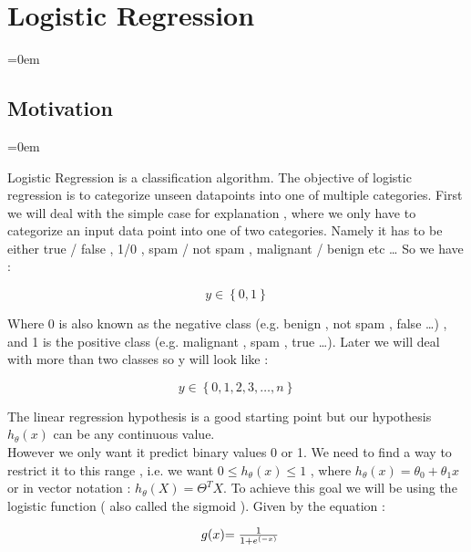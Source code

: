 
\section{Logistic Regression}
\label{sec:logistic_regression}
\parindent=0em

\subsection{Motivation}
\label{ssec:motivation}
\parindent=0em

Logistic Regression is a classification algorithm. The objective of logistic
regression is to categorize unseen datapoints into one of multiple categories.
First we will deal with the simple case for explanation , where we only have to
categorize an input data point into one of two categories. Namely it has to be
either true / false , 1/0 , spam / not spam , malignant / benign etc \ldots
So we have :

\[ y \in \left\{ 0,1 \right\} \]

Where 0 is also known as the negative class (e.g. benign , not spam , false
\ldots) , and 1 is the positive class (e.g. malignant , spam , true \ldots).
Later we will deal with more than two classes so y will look like :

\[ y \in \left\{ 0,1,2,3, \ldots , n \right\} \]

The linear regression hypothesis is a good starting point but our hypothesis
\( h_{\theta} (x) \) can be any continuous value. \\

However we only want it predict binary values 0 or 1. We need to find a way to
restrict it to this range , i.e.  we want \( 0 \leq h_{\theta} (x) \leq 1 \) ,
where \( h_\theta (x) = \theta_0 + \theta_1 x \) or in vector notation : \(
	h_{\theta}(X) = \Theta^T X \). To achieve this goal we will be using the
logistic function ( also called the sigmoid ). Given by the equation : 

\[
	\begin{array}{ l@{} l@{} }
		g(x)
		& =
		\frac{1}
		{
			1+e^
			{
				\left( - x \right)
			}
		}
	\end{array}
\]


